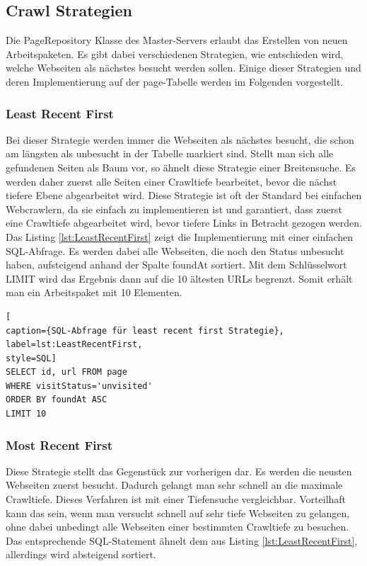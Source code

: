 \subsection{Crawl Strategien}
\label{subsec:CrawlStrategien}
Die PageRepository Klasse des Master-Servers erlaubt das Erstellen von neuen Arbeitspaketen. Es gibt dabei verschiedenen Strategien, wie entschieden wird, welche Webseiten als nächstes besucht werden sollen. Einige dieser Strategien und deren Implementierung auf der page-Tabelle werden im Folgenden vorgestellt.
\subsubsection{Least Recent First} 
Bei dieser Strategie werden immer die Webseiten als nächstes besucht, die schon am längsten als unbesucht in der Tabelle markiert sind. Stellt man sich alle gefundenen Seiten als Baum vor, so ähnelt diese Strategie einer Breitensuche. Es werden daher zuerst alle Seiten einer Crawltiefe bearbeitet, bevor die nächst tiefere Ebene abgearbeitet wird. Diese Strategie ist oft der Standard bei einfachen Webcrawlern, da sie einfach zu implementieren ist und garantiert, dass zuerst eine Crawltiefe abgearbeitet wird, bevor tiefere Links in Betracht gezogen werden.\\
Das Listing \ref{lst:LeastRecentFirst} zeigt die Implementierung mit einer einfachen SQL-Abfrage. Es werden dabei alle Webseiten, die noch den Status unbesucht haben, aufsteigend anhand der Spalte foundAt sortiert. Mit dem Schlüsselwort LIMIT wird das Ergebnis dann auf die 10 ältesten URLs begrenzt. Somit erhält man ein Arbeitspaket mit 10 Elementen.\\
\begin{lstlisting}[
caption={SQL-Abfrage für least recent first Strategie},
label=lst:LeastRecentFirst,
style=SQL]
SELECT id, url FROM page
WHERE visitStatus='unvisited'
ORDER BY foundAt ASC
LIMIT 10
\end{lstlisting}

\subsubsection{Most Recent First}  
Diese Strategie stellt das Gegenstück zur vorherigen dar. Es werden die neusten Webseiten zuerst besucht. Dadurch gelangt man sehr schnell an die maximale Crawltiefe. Dieses Verfahren ist mit einer Tiefensuche vergleichbar. Vorteilhaft kann das sein, wenn man versucht schnell auf sehr tiefe Webseiten zu gelangen, ohne dabei unbedingt alle Webseiten einer bestimmten Crawltiefe zu besuchen. Das entsprechende SQL-Statement ähnelt dem aus Listing \ref{lst:LeastRecentFirst}, allerdings wird absteigend sortiert.

